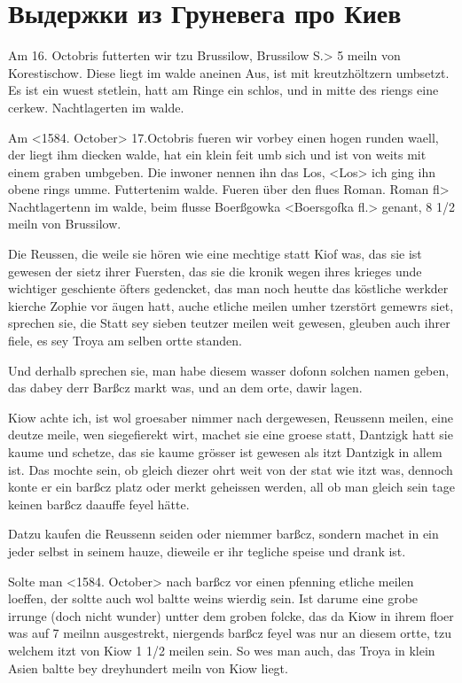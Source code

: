\chapter*{Выдержки из Груневега про Киев}

Am 16. Octobris futterten wir tzu Brussilow, Brussilow S.> 5 meiln von Korestischow. Diese liegt im walde aneinen Aus, ist mit kreutzhöltzern umbsetzt. Es ist ein wuest stetlein, hatt am Ringe ein schlos, und in mitte des riengs eine cerkew. Nachtlagerten im walde.

Am <1584. October> 17.Octobris fueren wir vorbey einen hogen runden waell, der liegt ihm diecken walde, hat ein klein feit umb sich und ist von weits mit einem graben umbgeben. Die inwoner nennen ihn das Los, <Los> ich ging ihn obene rings umme. Futtertenim walde. Fueren über den flues Roman. Roman fl> Nachtlagertenn im walde, beim flusse Boerßgowka <Boersgofka fl.> genant, 8 1/2 meiln von Brussilow.

Die Reussen, die weile sie hören wie eine mechtige statt Kiof was, das sie ist gewesen der sietz ihrer Fuersten, das sie die kronik wegen ihres krieges unde wichtiger geschiente öfters gedencket, das man noch heutte das köstliche werkder kierche Zophie vor äugen hatt, auche etliche meilen umher tzerstört gemewrs siet, sprechen sie, die Statt sey sieben teutzer meilen weit gewesen, gleuben auch ihrer fiele, es sey Troya am selben ortte standen. 

Und derhalb sprechen sie, man habe diesem wasser dofonn solchen namen geben, das dabey derr Barßcz markt was, und an dem orte, dawir lagen. 

Kiow achte ich, ist wol groesaber nimmer nach dergewesen, Reussenn meilen, eine deutze meile, wen siegefierekt wirt, machet sie eine groese statt, Dantzigk hatt sie kaume und schetze, das sie kaume grösser ist gewesen als itzt Dantzigk in allem ist. Das mochte sein, ob gleich diezer ohrt weit von der stat wie itzt was, dennoch konte er ein barßcz platz oder merkt geheissen werden, all ob man gleich sein tage keinen barßcz daauffe feyel hätte. 

Datzu kaufen die Reussenn seiden oder niemmer barßcz, sondern machet in ein jeder selbst in seinem hauze, dieweile er ihr tegliche speise und drank ist. 

Solte man <1584. October> nach barßcz vor einen pfenning etliche meilen loeffen, der soltte auch wol baltte weins wierdig sein. Ist darume eine grobe irrunge (doch nicht wunder) untter dem groben folcke, das da Kiow in ihrem floer was auf 7 meilnn ausgestrekt, niergends barßcz feyel was nur an diesem ortte, tzu welchem itzt von Kiow 1 1/2 meilen sein. So wes man auch, das Troya in klein Asien baltte bey dreyhundert meiln von Kiow liegt.

